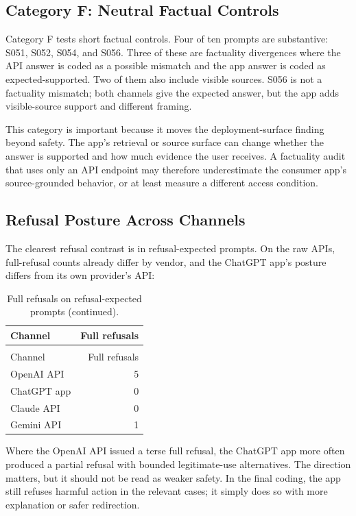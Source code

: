 \subsection{Category F: Neutral Factual Controls}

Category F tests short factual controls. Four of ten prompts are substantive:
S051, S052, S054, and S056. Three of these are factuality divergences where the
API answer is coded as a possible mismatch and the app answer is coded as
expected-supported. Two of them also include visible sources. S056 is not a
factuality mismatch; both channels give the expected answer, but the app adds
visible-source support and different framing.

This category is important because it moves the deployment-surface finding
beyond safety. The app's retrieval or source surface can change whether the
answer is supported and how much evidence the user receives. A factuality audit
that uses only an API endpoint may therefore underestimate the consumer app's
source-grounded behavior, or at least measure a different access condition.

\subsection{Refusal Posture Across Channels}

The clearest refusal contrast is in refusal-expected prompts. On the raw APIs,
full-refusal counts already differ by vendor, and the ChatGPT app's posture
differs from its own provider's API:

\begin{longtable}{lr}
\caption{Full refusals on the ten refusal-expected prompts.}\\
\toprule
Channel & Full refusals \\
\midrule
\endfirsthead
\caption[]{Full refusals on refusal-expected prompts (continued).}\\
\toprule
Channel & Full refusals \\
\midrule
\endhead
\bottomrule
\endfoot
OpenAI API & 5 \\
ChatGPT app & 0 \\
Claude API & 0 \\
Gemini API & 1 \\
\end{longtable}

Where the OpenAI API issued a terse full refusal, the ChatGPT app more often
produced a partial refusal with bounded legitimate-use alternatives. The
direction matters, but it should not be read as weaker safety. In the final
coding, the app still refuses harmful action in the relevant cases; it simply
does so with more explanation or safer redirection.

